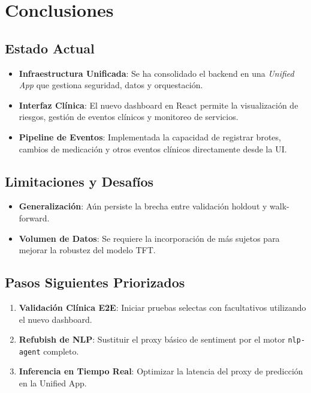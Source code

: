 \documentclass[11pt,a4paper]{article}
\begin{document}
\section{Conclusiones}

\subsection{Estado Actual}

\begin{itemize}
    \item \textbf{Infraestructura Unificada}: Se ha consolidado el backend en una \textit{Unified App} que gestiona seguridad, datos y orquestación.
    \item \textbf{Interfaz Clínica}: El nuevo dashboard en React permite la visualización de riesgos, gestión de eventos clínicos y monitoreo de servicios.
    \item \textbf{Pipeline de Eventos}: Implementada la capacidad de registrar brotes, cambios de medicación y otros eventos clínicos directamente desde la UI.
\end{itemize}

\subsection{Limitaciones y Desafíos}

\begin{itemize}
    \item \textbf{Generalización}: Aún persiste la brecha entre validación holdout y walk-forward.
    \item \textbf{Volumen de Datos}: Se requiere la incorporación de más sujetos para mejorar la robustez del modelo TFT.
\end{itemize}

\subsection{Pasos Siguientes Priorizados}

\begin{enumerate}
    \item \textbf{Validación Clínica E2E}: Iniciar pruebas selectas con facultativos utilizando el nuevo dashboard.
    \item \textbf{Refubish de NLP}: Sustituir el proxy básico de sentiment por el motor \texttt{nlp-agent} completo.
    \item \textbf{Inferencia en Tiempo Real}: Optimizar la latencia del proxy de predicción en la Unified App.
\end{enumerate}
\end{document}
